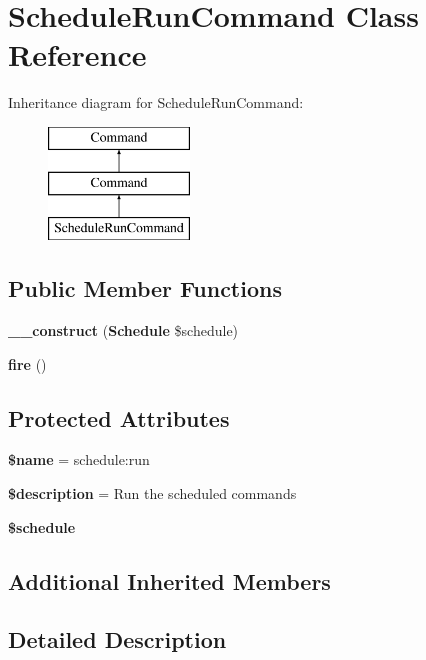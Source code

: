 \section{Schedule\+Run\+Command Class Reference}
\label{class_illuminate_1_1_console_1_1_scheduling_1_1_schedule_run_command}
Inheritance diagram for Schedule\+Run\+Command\+:\begin{figure}[H]
\begin{center}
\leavevmode
\includegraphics[height=3.000000cm]{class_illuminate_1_1_console_1_1_scheduling_1_1_schedule_run_command}
\end{center}
\end{figure}
\subsection*{Public Member Functions}
\begin{DoxyCompactItemize}
\item 
{\bf \+\_\+\+\_\+construct} ({\bf Schedule} \$schedule)
\item 
{\bf fire} ()
\end{DoxyCompactItemize}
\subsection*{Protected Attributes}
\begin{DoxyCompactItemize}
\item 
{\bf \$name} = \textquotesingle{}schedule\+:run\textquotesingle{}
\item 
{\bf \$description} = \textquotesingle{}Run the scheduled commands\textquotesingle{}
\item 
{\bf \$schedule}
\end{DoxyCompactItemize}
\subsection*{Additional Inherited Members}


\subsection{Detailed Description}



